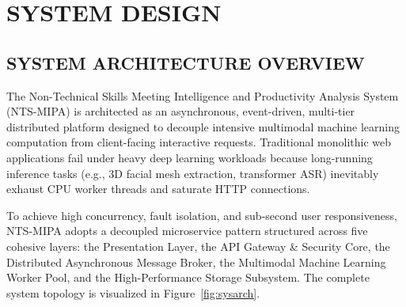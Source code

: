 \documentclass[12pt,a4paper,oneside]{report}
\begin{document}
\chapter{SYSTEM DESIGN}

\section{SYSTEM ARCHITECTURE OVERVIEW}
The Non-Technical Skills Meeting Intelligence and Productivity Analysis System (NTS-MIPA) is architected as an asynchronous, event-driven, multi-tier distributed platform designed to decouple intensive multimodal machine learning computation from client-facing interactive requests. Traditional monolithic web applications fail under heavy deep learning workloads because long-running inference tasks (e.g., 3D facial mesh extraction, transformer ASR) inevitably exhaust CPU worker threads and saturate HTTP connections. 

To achieve high concurrency, fault isolation, and sub-second user responsiveness, NTS-MIPA adopts a decoupled microservice pattern structured across five cohesive layers: the Presentation Layer, the API Gateway \& Security Core, the Distributed Asynchronous Message Broker, the Multimodal Machine Learning Worker Pool, and the High-Performance Storage Subsystem. The complete system topology is visualized in Figure~\ref{fig:sysarch}.
\end{document}
